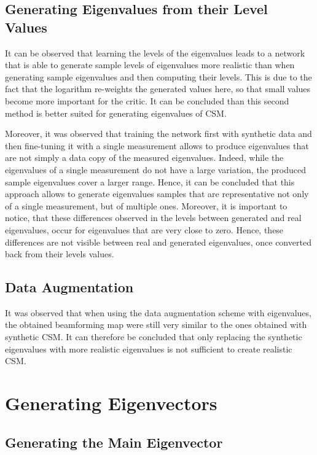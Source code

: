 \documentclass[11pt,a4paper,twoside]{report}
\begin{document}
\subsection{Generating Eigenvalues from their Level Values}

It can be observed that learning the levels of the eigenvalues leads to a network that is able to generate sample levels of eigenvalues more realistic than when generating sample eigenvalues and then computing their levels. This is due to the fact that the logarithm re-weights the generated values here, so that small values become more important for the critic. It can be concluded than this second method is better suited for generating eigenvalues of CSM.

Moreover, it was observed that training the network first with synthetic data and then fine-tuning it with a single measurement allows to produce eigenvalues that are not simply a data copy of the measured eigenvalues. Indeed, while the eigenvalues of a single measurement do not have a large variation, the produced sample eigenvalues cover a larger range. Hence, it can be concluded that this approach allows to generate eigenvalues samples that are representative not only of a single measurement, but of multiple ones. Moreover, it is important to notice, that these differences observed in the levels between generated and real eigenvalues, occur for eigenvalues that are very close to zero. Hence, these differences are not visible between real and generated eigenvalues, once converted back from their levels values.


\subsection{Data Augmentation}

It was observed that when using the data augmentation scheme with eigenvalues, the obtained beamforming map were still very similar to the ones obtained with synthetic CSM. It can therefore be concluded that only replacing the synthetic eigenvalues with more realistic eigenvalues is not sufficient to create realistic CSM.

\section{Generating Eigenvectors}

\subsection{Generating the Main Eigenvector}
\end{document}
